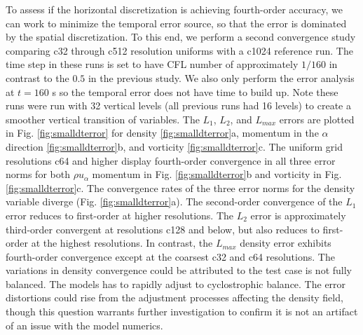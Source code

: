 To assess if the horizontal discretization is achieving fourth-order accuracy,
we can work to minimize the temporal error source, so that the error is dominated 
by the spatial discretization. To this end, we perform a second convergence study comparing
c32 through c512 resolution uniforms with a c1024 reference run.
The time step in these runs is set to have CFL number of approximately $1/160$ in contrast to the $0.5$ in the previous study. 
We also only perform the error analysis at $t=160$ s so the temporal error does not have time to build up.
Note these runs were run with 32 vertical levels (all previous runs had 16 levels) to create a smoother vertical transition of variables.
The $L_1$, $L_2$, and $L_{max}$ errors are plotted in Fig. \ref{fig:smalldterror} for density \ref{fig:smalldterror}a, 
momentum in the $\alpha$ direction \ref{fig:smalldterror}b, and vorticity \ref{fig:smalldterror}c.
The uniform grid resolutions c64 and higher display fourth-order convergence in all 
three error norms for both $\rho u_\alpha$ momentum in Fig. \ref{fig:smalldterror}b
and vorticity in Fig. \ref{fig:smalldterror}c. The convergence rates of the three error 
norms for the density variable diverge (Fig. \ref{fig:smalldterror}a).  The  
second-order convergence of the $L_1$ error reduces to first-order at higher resolutions. 
The $L_2$ error is approximately third-order convergent at resolutions c128 and below, but also 
reduces to first-order at the highest resolutions. In contrast, the $L_{max}$ density error 
exhibits fourth-order convergence except at the coarsest c32 and c64 resolutions.
The variations in density convergence could be attributed to the test case 
is not fully balanced. The models has to rapidly adjust to cyclostrophic balance. 
The error distortions could rise from the adjustment processes affecting the density 
field, though this question warrants further investigation to confirm it is not an artifact of an
issue with the model numerics.

